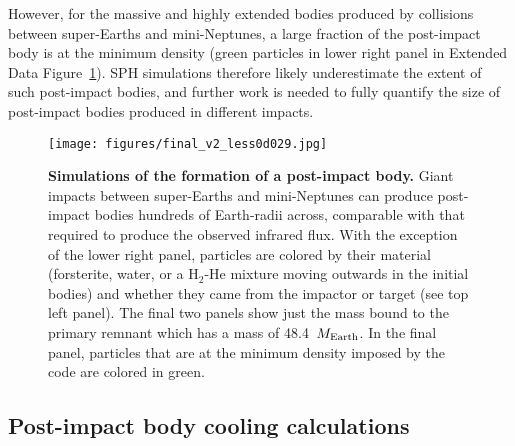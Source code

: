 \documentclass[sn-nature,oneside]{sn-jnl}%
\begin{document}
However, for the massive and highly extended bodies produced by collisions between super-Earths and mini-Neptunes, a large fraction of the post-impact body is at the minimum density (green particles in lower right panel in Extended Data Figure~\ref{fig:SPH}).
%
SPH simulations therefore likely underestimate the extent of such post-impact bodies, and further work is needed to fully quantify the size of post-impact bodies produced in different impacts.


\begin{figure}
    \centering
\texttt{[image: figures/final\_v2\_less0d029.jpg]}
    \caption{\textbf{Simulations of the formation of a post-impact body.}
    Giant impacts between super-Earths and mini-Neptunes can produce post-impact bodies hundreds of Earth-radii across, comparable with that required to produce the observed infrared flux.
    With the exception of the lower right panel, particles are colored by their material (forsterite, water, or a H$_2$-He mixture moving outwards in the initial bodies) and whether they came from the impactor or target (see top left panel).
    The final two panels show just the mass bound to the primary remnant which has a mass of 48.4~$M_{\rm Earth}$.
    In the final panel, particles that are at the minimum density imposed by the code are colored in green.}
    \label{fig:SPH}
\end{figure}

\subsection*{Post-impact body cooling calculations}
\end{document}
